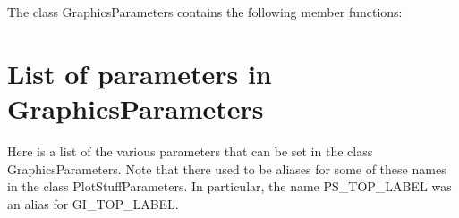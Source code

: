\documentclass{article}
\begin{document}
The class GraphicsParameters contains the following member functions:



\section{List of parameters in GraphicsParameters}\label{sec:list-of-parameters}
Here is a list of the various parameters that can be set in the class
GraphicsParameters. Note that there used to be aliases for some of
these names in the class PlotStuffParameters. In particular, the name
PS\_TOP\_LABEL was an alias for GI\_TOP\_LABEL. 
\vspace{2\baselineskip}
\tablefirsthead{\hline}
\tabletail{\hline}
\end{document}
